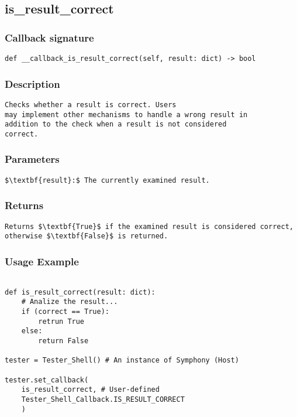 \subsection{is\_result\_correct}

\subsubsection{Callback signature}
\begin{lstlisting}
def __callback_is_result_correct(self, result: dict) -> bool
\end{lstlisting}

\subsubsection{Description}
\begin{lstlisting}[mathescape=true, keywordstyle=\color{black}, showstringspaces=false]
Checks whether a result is correct. Users 
may implement other mechanisms to handle a wrong result in 
addition to the check when a result is not considered 
correct.
\end{lstlisting}

\subsubsection{Parameters}
\begin{lstlisting}[mathescape=true, keywordstyle=\color{black}]
$\textbf{result}:$ The currently examined result.
\end{lstlisting}

\subsubsection{Returns}
\begin{lstlisting}[mathescape=true, keywordstyle=\color{black}]
Returns $\textbf{True}$ if the examined result is considered correct, 
otherwise $\textbf{False}$ is returned.
\end{lstlisting}

\subsubsection{Usage Example}
\begin{lstlisting}

def is_result_correct(result: dict):
    # Analize the result...
    if (correct == True):
        retrun True
    else:
        return False

tester = Tester_Shell() # An instance of Symphony (Host)

tester.set_callback(
    is_result_correct, # User-defined
    Tester_Shell_Callback.IS_RESULT_CORRECT
    )
\end{lstlisting}
